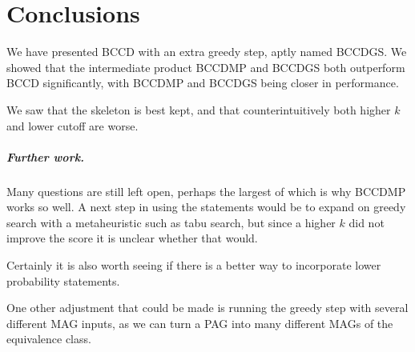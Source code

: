 \documentclass[11pt,a4paper]{report}
\theoremstyle{definition}
\begin{document}
\chapter{Conclusions}\label{conclusions}
We have presented BCCD with an extra greedy step, aptly named BCCDGS. We
showed that the intermediate product BCCDMP and BCCDGS both outperform
BCCD significantly, with BCCDMP and BCCDGS being closer in performance.

We saw that the skeleton is best kept, and that counterintuitively both
higher $k$ and lower cutoff are worse.

\paragraph{Further work.}
Many questions are still left open, perhaps the largest of which is why
BCCDMP works so well. A next step in using the statements would be to
expand on greedy search with a metaheuristic such as tabu search, but
since a higher $k$ did not improve the score it is unclear whether that
would.

Certainly it is also worth seeing if there is a better way to incorporate
lower probability statements.

One other adjustment that could be made is running the greedy step with
several different MAG inputs, as we can turn a PAG into many different
MAGs of the equivalence class.

\printbibliography


\end{document}
